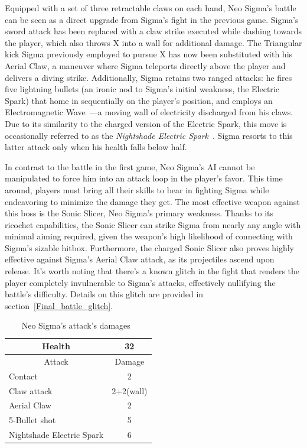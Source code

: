 Equipped with a set of three retractable claws on each hand, Neo Sigma's battle can be seen as a direct upgrade from Sigma's fight in the previous game. Sigma's sword attack has been replaced with a claw strike executed while dashing towards the player, which also throws X into a wall for additional damage. The Triangular kick Sigma previously employed to pursue X has now been substituted with his Aerial Claw, a maneuver where Sigma teleports directly above the player and delivers a diving strike. Additionally, Sigma retains two ranged attacks: he fires five lightning bullets (an ironic nod to Sigma's initial weakness, the Electric Spark) that home in sequentially on the player's position, and employs an Electromagnetic Wave~\cite{book:Compendium}—a moving wall of electricity discharged from his claws. Due to its similarity to the charged version of the Electric Spark, this move is occasionally referred to as the \textit{Nightshade Electric Spark}~\cite{book:MH_field_guide}. Sigma resorts to this latter attack only when his health falls below half.

In contrast to the battle in the first game, Neo Sigma's AI cannot be manipulated to force him into an attack loop in the player's favor. This time around, players must bring all their skills to bear in fighting Sigma while endeavoring to minimize the damage they get. The most effective weapon against this boss is the Sonic Slicer, Neo Sigma's primary weakness. Thanks to its ricochet capabilities, the Sonic Slicer can strike Sigma from nearly any angle with minimal aiming required, given the weapon's high likelihood of connecting with Sigma's sizable hitbox. Furthermore, the charged Sonic Slicer also proves highly effective against Sigma's Aerial Claw attack, as its projectiles ascend upon release. It's worth noting that there's a known glitch in the fight that renders the player completely invulnerable to Sigma's attacks, effectively nullifying the battle's difficulty. Details on this glitch are provided in section~\ref{Final_battle_glitch}.
\begin{table}[htp]
	\centering
	\begin{tabular}[htp]{l c}
		\toprule
		\multicolumn{1}{c}{Health}  & 32 \\
		\midrule
		\multicolumn{1}{c}{Attack} & \multicolumn{1}{c}{Damage}\\
		Contact & 2 \\
		Claw attack & 2+2(wall)\\
		Aerial Claw& 2\\
		5-Bullet shot& 5\\
		Nightshade Electric Spark& 6\\
		\bottomrule
	\end{tabular}
	\caption{Neo Sigma's attack's damages~\cite{wiki:Neo_sigma}}
\end{table}

